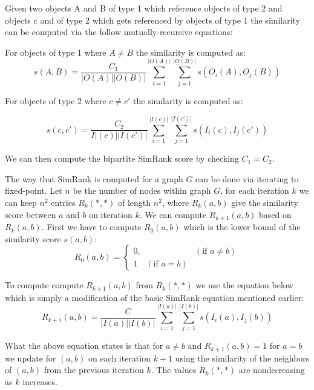 \begin{definition}\label{def:bipartite_simrank} Given two objects A and B of type 1 which reference objects of type 2 and objects c and of type 2 which gets referenced by objects of type 1 the similarity can be computed via the follow mutually-recursive equations:
	
	For objects of type 1 where $A \neq B$ the similarity is computed as:
	\begin{equation}\label{eq:bipartite_simrank1}
	s(A,B)= \frac{C_1}{|O(A)||O(B)|}\sum^{|O(A)|}_{i=1}\sum^{|O(B)|}_{j=1}s(O_i(A),O_j(B))
	\end{equation}
	
	For objects of type 2 where $c \neq c'$ the similarity is computed as:

	\begin{equation}
	s(c,c')= \frac{C_2}{I|(c)||I(c')|}\sum^{|I(c)|}_{i=1}\sum^{|I(c')|}_{j=1}s(I_i(c),I_j(c'))

	\end{equation}
	
	We can then compute the bipartite SimRank score by checking $C_1 = C_2$\cite{10.1145/775047.775126}.
\end{definition}

The way that SimRank is computed for a graph $G$ can be done via iterating to fixed-point. Let $n$ be the number of nodes within graph $G$, for each iteration $k$ we can keep $n^2$ entries $R_k(*,*)$ of length $n^2$, where $R_k(a,b)$ give the similarity score between $a$ and $b$ on iteration $k$\cite{10.1145/775047.775126}. We can compute $R_{k+1}(a,b)$ based on $R_k(a,b)$. First we have to compute $R_0(a,b)$ which is the lower bound of the similarity score $s(a,b)$:
\begin{equation}
R_0(a,b)= \begin{cases}
0, & (\text{if } a \neq b) \\

1 \quad (\text{if } a = b)
\end{cases}
\end{equation}

To compute compute $R_{k+1}(a,b)$ from $R_k(*,*)$ we use the equation below which is simply a modification of the basic SimRank equation mentioned earlier:
\begin{equation}
R_{k+1}(a,b)= \frac{C}{|I(a)||I(b)|}\sum^{|I(a)|}_{i=1}\sum^{|I(b)|}_{j=1}s(I_i(a),I_j(b))
\end{equation}

What the above equation states is that for $a \neq b$ and $R_{k+1}(a,b) = 1$ for $a = b$ we update for $(a,b)$ on each iteration $k+1$ using the similarity of the neighbors of $(a,b)$ from the previous iteration $k$. The values $R_k(*,*)$ are nondecreasing as $k$ increases. 
